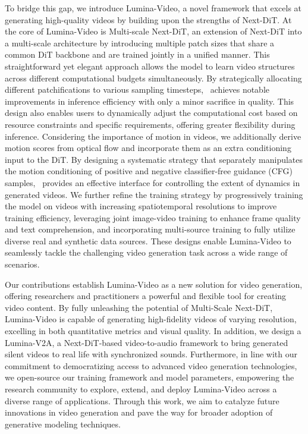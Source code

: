 To bridge this gap, we introduce Lumina-Video, a novel framework that excels at generating high-quality videos by building upon the strengths of Next-DiT. 
At the core of Lumina-Video is Multi-scale Next-DiT, an extension of Next-DiT into a multi-scale architecture by introducing multiple patch sizes that share a common DiT backbone and are trained jointly in a unified manner. 
This straightforward yet elegant approach allows the model to learn video structures across different computational budgets simultaneously. By strategically allocating different patchifications to various sampling timesteps,~\sysname{} achieves notable improvements in inference efficiency with only a minor sacrifice in quality. This design also enables users to dynamically adjust the computational cost based on resource constraints and specific requirements, offering greater flexibility during inference.
Considering the importance of motion in videos, we additionally derive motion scores from optical flow and incorporate them as an extra conditioning input to the DiT. By designing a systematic strategy that separately manipulates the motion conditioning of positive and negative classifier-free guidance (CFG)~\citep{cfg} samples,~\sysname{} provides an effective interface for controlling the extent of dynamics in generated videos. 
We further refine the training strategy by progressively training the model on videos with increasing spatiotemporal resolutions to improve training efficiency, leveraging joint image-video training to enhance frame quality and text comprehension, and incorporating multi-source training to fully utilize diverse real and synthetic data sources. These designs enable Lumina-Video to seamlessly tackle the challenging video generation task across a wide range of scenarios.

Our contributions establish Lumina-Video as a new solution for video generation, 
offering researchers and practitioners a powerful and flexible tool for creating video content. 
By fully unleashing the potential of Multi-Scale Next-DiT, Lumina-Video is capable of generating high-fidelity videos of varying resolution, excelling in both quantitative metrics and visual quality. 
In addition, we design a Lumina-V2A, a Next-DiT-based video-to-audio framework to bring generated silent videos to real life with synchronized sounds. 
Furthermore, in line with our commitment to democratizing access to advanced video generation technologies, we open-source our training framework and model parameters, empowering the research community to explore, extend, and deploy Lumina-Video across a diverse range of applications. 
Through this work, we aim to catalyze future innovations in video generation and pave the way for broader adoption of generative modeling techniques.